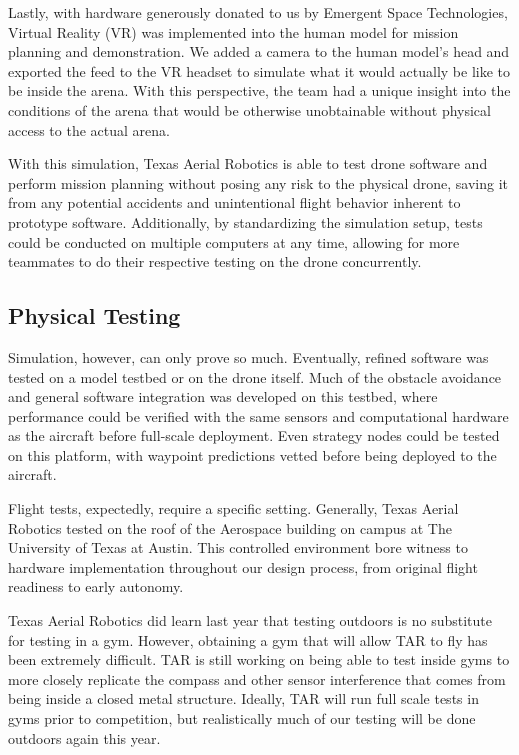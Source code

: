 \documentclass[12pt,letterpaper]{article}
\begin{document}
	Lastly, with hardware generously donated to us by Emergent Space Technologies, Virtual Reality (VR) was implemented into the human model for mission planning and demonstration. We added a camera to the human model’s head and exported the feed to the VR headset to simulate what it would actually be like to be inside the arena. With this perspective, the team had a unique insight into the conditions of the arena that would be otherwise unobtainable without physical access to the actual arena.

	With this simulation, Texas Aerial Robotics is able to test drone software and perform mission planning without posing any risk to the physical drone, saving it from any potential accidents and unintentional flight behavior inherent to prototype software. Additionally, by standardizing the simulation setup, tests could be conducted on multiple computers at any time, allowing for more teammates to do their respective testing on the drone concurrently.


	\subsection*{Physical Testing}
	Simulation, however, can only prove so much. Eventually, refined software was tested on a model testbed or on the drone itself. Much of the obstacle avoidance and general software integration was developed on this testbed, where performance could be verified with the same sensors and computational hardware as the aircraft before full-scale deployment. Even strategy nodes could be tested on this platform, with waypoint predictions vetted before being deployed to the aircraft.

	Flight tests, expectedly, require a specific setting. Generally, Texas Aerial Robotics tested on the roof of the Aerospace building on campus at The University of Texas at Austin. This controlled environment bore witness to hardware implementation throughout our design process, from original flight readiness to early autonomy.

	Texas Aerial Robotics did learn last year that testing outdoors is no substitute for testing in a gym. However, obtaining a gym that will allow TAR to fly has been extremely difficult. TAR is still working on being able to test inside gyms to more closely replicate the compass and other sensor interference that comes from being inside a closed metal structure. Ideally, TAR will run full scale tests in gyms prior to competition, but realistically much of our testing will be done outdoors again this year.
\end{document}
